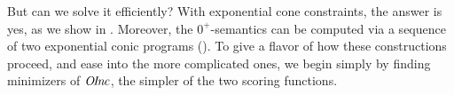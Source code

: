 But can we solve it efficiently?
% 
With exponential cone constraints,
the answer is yes, as we show in .
Moreover,
the $0^+$\!-semantics
can be computed via a sequence of two exponential conic programs ().
To give a flavor of how these constructions proceed, and ease into
the more complicated ones, we begin simply by finding minimizers of $\mathit{O\mskip-2.5muI\mskip-3.5mun\mskip-1.7muc}$, the simpler of the two scoring functions.

